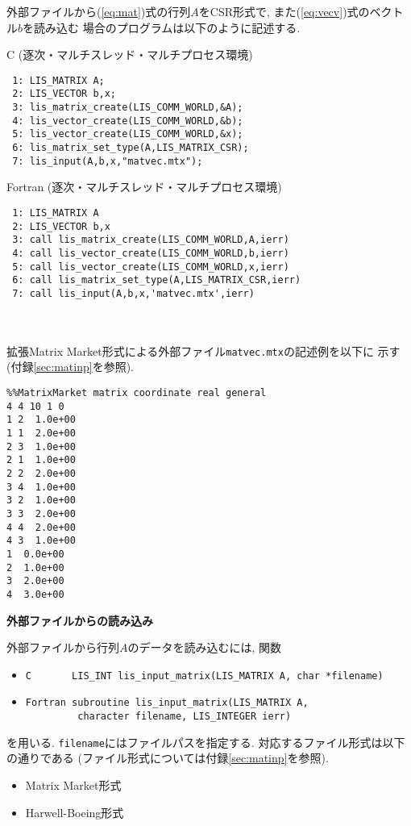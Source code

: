 \documentclass[a4paper]{jarticle}
\begin{document}
{{外部ファイルから(\ref{eq:mat})式の行列$A$をCSR形式で, また(\ref{eq:vecv})式のベクトル$b$を読み込む
場合のプログラムは以下のように記述する. 
\begin{itembox}[l]{C (逐次・マルチスレッド・マルチプロセス環境)}
\small
\begin{verbatim}
 1: LIS_MATRIX A;
 2: LIS_VECTOR b,x;
 3: lis_matrix_create(LIS_COMM_WORLD,&A); 
 4: lis_vector_create(LIS_COMM_WORLD,&b); 
 5: lis_vector_create(LIS_COMM_WORLD,&x); 
 6: lis_matrix_set_type(A,LIS_MATRIX_CSR); 
 7: lis_input(A,b,x,"matvec.mtx"); 
\end{verbatim}
\end{itembox}
\begin{itembox}[l]{Fortran (逐次・マルチスレッド・マルチプロセス環境)}
\small
\begin{verbatim}
 1: LIS_MATRIX A
 2: LIS_VECTOR b,x
 3: call lis_matrix_create(LIS_COMM_WORLD,A,ierr) 
 4: call lis_vector_create(LIS_COMM_WORLD,b,ierr) 
 5: call lis_vector_create(LIS_COMM_WORLD,x,ierr) 
 6: call lis_matrix_set_type(A,LIS_MATRIX_CSR,ierr) 
 7: call lis_input(A,b,x,'matvec.mtx',ierr) 
\end{verbatim}
\end{itembox}
\\ \\
拡張Matrix Market形式による外部ファイル{\tt matvec.mtx}の記述例を以下に
示す (付録\ref{sec:matinp}を参照). 
{\small
\begin{verbatim}
%%MatrixMarket matrix coordinate real general
4 4 10 1 0
1 2  1.0e+00
1 1  2.0e+00
2 3  1.0e+00
2 1  1.0e+00
2 2  2.0e+00
3 4  1.0e+00
3 2  1.0e+00
3 3  2.0e+00
4 4  2.0e+00
4 3  1.0e+00
1  0.0e+00
2  1.0e+00
3  2.0e+00
4  3.0e+00
\end{verbatim}
}

\noindent
{\bf 外部ファイルからの読み込み}

外部ファイルから行列$A$のデータを読み込むには, 関数
\begin{itemize}
\item \verb|C       LIS_INT lis_input_matrix(LIS_MATRIX A, char *filename)|
\item \verb|Fortran subroutine lis_input_matrix(LIS_MATRIX A, |\\
      \verb|         character filename, LIS_INTEGER ierr)|
\end{itemize}
を用いる. {\tt filename}にはファイルパスを指定する. 
対応するファイル形式は以下の通りである (ファイル形式については付録\ref{sec:matinp}を参照). 
\begin{itemize}
\item Matrix Market形式
\item Harwell-Boeing形式
\end{itemize}

}}
\end{document}
